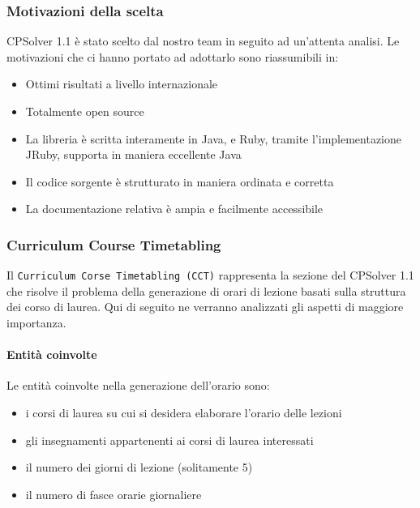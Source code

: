 \documentclass[11pt,a4paper]{article}
\begin{document}
\subsubsection*{Motivazioni della scelta}
CPSolver 1.1 è stato scelto dal nostro team in seguito ad un'attenta analisi. Le motivazioni che ci hanno portato ad adottarlo sono riassumibili in:
\begin{itemize}
 \item Ottimi risultati a livello internazionale
 \item Totalmente open source
 \item La libreria è scritta interamente in Java, e Ruby, tramite l'implementazione JRuby, supporta in maniera eccellente Java
 \item Il codice sorgente è strutturato in maniera ordinata e corretta
 \item La documentazione relativa è ampia e facilmente accessibile
\end{itemize}
\subsubsection*{Curriculum Course Timetabling}
Il \verb|Curriculum Corse Timetabling (CCT)| rappresenta la sezione del CPSolver 1.1 che risolve il problema della generazione di orari di lezione basati sulla struttura dei corso di laurea. Qui di seguito ne verranno analizzati gli aspetti di maggiore importanza.
\paragraph{Entità coinvolte}
Le entità coinvolte  nella generazione dell'orario sono:
\begin{itemize}
 \item i corsi di laurea su cui si desidera elaborare l'orario delle lezioni
 \item gli insegnamenti appartenenti ai corsi di laurea interessati
 \item il numero dei giorni di lezione (solitamente 5)
 \item il numero di fasce orarie giornaliere
\end{itemize}
\end{document}
